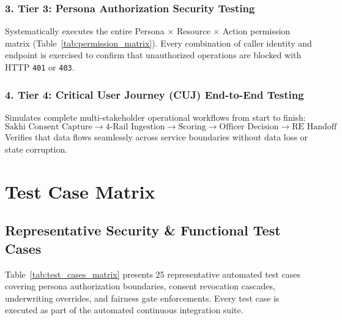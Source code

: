 \documentclass[11pt,a4paper,oneside]{report}
\begin{document}
\subsection{3. Tier 3: Persona Authorization Security Testing}
Systematically executes the entire Persona $\times$ Resource $\times$ Action permission matrix (Table~\ref{tab:permission_matrix}). Every combination of caller identity and endpoint is exercised to confirm that unauthorized operations are blocked with HTTP \texttt{401} or \texttt{403}.

\subsection{4. Tier 4: Critical User Journey (CUJ) End-to-End Testing}
Simulates complete multi-stakeholder operational workflows from start to finish:
$$\text{Sakhi Consent Capture} \longrightarrow \text{4-Rail Ingestion} \longrightarrow \text{Scoring} \longrightarrow \text{Officer Decision} \longrightarrow \text{RE Handoff}$$
Verifies that data flows seamlessly across service boundaries without data loss or state corruption.




\chapter{Test Case Matrix}
\label{chap:test_case_matrix}

\section{Representative Security \& Functional Test Cases}
Table~\ref{tab:test_cases_matrix} presents 25 representative automated test cases covering persona authorization boundaries, consent revocation cascades, underwriting overrides, and fairness gate enforcements. Every test case is executed as part of the automated continuous integration suite.
\end{document}
